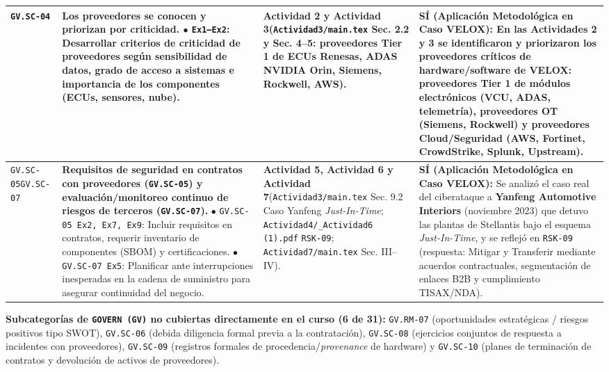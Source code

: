 \documentclass[letterpaper,11pt]{article}
\begin{document}
\begin{longtable}{|C{1.5cm}|L{5.3cm}|L{4.3cm}|L{5.8cm}|}
\texttt{GV.SC-04} &
\textbf{Los proveedores se conocen y priorizan por criticidad.}\newline
$\bullet$ \texttt{Ex1--Ex2}: Desarrollar criterios de criticidad de proveedores según sensibilidad de datos, grado de acceso a sistemas e importancia de los componentes (ECUs, sensores, nube). &
\textbf{Actividad 2 y Actividad 3}\newline (\texttt{Actividad3/main.tex} Sec. 2.2 y Sec. 4--5: proveedores Tier 1 de ECUs Renesas, ADAS NVIDIA Orin, Siemens, Rockwell, AWS). &
\textbf{SÍ (Aplicación Metodológica en Caso VELOX):}\newline
En las Actividades 2 y 3 se identificaron y priorizaron los proveedores críticos de hardware/software de VELOX: proveedores Tier 1 de módulos electrónicos (VCU, ADAS, telemetría), proveedores OT (Siemens, Rockwell) y proveedores Cloud/Seguridad (AWS, Fortinet, CrowdStrike, Splunk, Upstream). \\
\hline

\texttt{GV.SC-05}\newline \texttt{GV.SC-07} &
\textbf{Requisitos de seguridad en contratos con proveedores (\texttt{GV.SC-05}) y evaluación/monitoreo continuo de riesgos de terceros (\texttt{GV.SC-07}).}\newline
$\bullet$ \texttt{GV.SC-05 Ex2, Ex7, Ex9}: Incluir requisitos en contratos, requerir inventario de componentes (SBOM) y certificaciones.\newline
$\bullet$ \texttt{GV.SC-07 Ex5}: Planificar ante interrupciones inesperadas en la cadena de suministro para asegurar continuidad del negocio. &
\textbf{Actividad 5, Actividad 6 y Actividad 7}\newline (\texttt{Actividad3/main.tex} Sec. 9.2 Caso Yanfeng \textit{Just-In-Time}; \texttt{Actividad4/\_Actividad6 (1).pdf} \texttt{RSK-09}; \texttt{Actividad7/main.tex} Sec. III--IV). &
\textbf{SÍ (Aplicación Metodológica en Caso VELOX):}\newline
Se analizó el caso real del ciberataque a \textbf{Yanfeng Automotive Interiors} (noviembre 2023) que detuvo las plantas de Stellantis bajo el esquema \textit{Just-In-Time}, y se reflejó en \texttt{RSK-09} (respuesta: Mitigar y Transferir mediante acuerdos contractuales, segmentación de enlaces B2B y cumplimiento TISAX/NDA). \\
\hline
\end{longtable}
\endgroup

\noindent\textbf{Subcategorías de \texttt{GOVERN (GV)} no cubiertas directamente en el curso (6 de 31):} \texttt{GV.RM-07} (oportunidades estratégicas / riesgos positivos tipo SWOT), \texttt{GV.SC-06} (debida diligencia formal previa a la contratación), \texttt{GV.SC-08} (ejercicios conjuntos de respuesta a incidentes con proveedores), \texttt{GV.SC-09} (registros formales de procedencia/\textit{provenance} de hardware) y \texttt{GV.SC-10} (planes de terminación de contratos y devolución de activos de proveedores).
\end{document}
